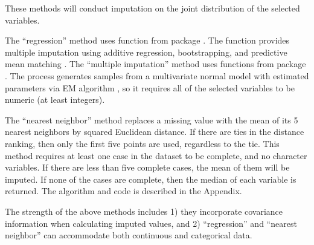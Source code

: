 \documentclass[article]{jss}
\begin{document}
These methods will conduct imputation on the joint distribution of the selected variables. 

The ``regression'' method uses function  from package . The function provides multiple imputation using additive regression, bootstrapping, and predictive mean matching \citep{hmisc}. The ``multiple imputation'' method uses functions from package . The process generates samples from a multivariate normal model with estimated parameters via EM algorithm \citep{norm}, so it requires all of the selected variables to be numeric (at least integers).

The ``nearest neighbor'' method replaces a missing value with the mean of its 5 nearest neighbors by squared Euclidean distance. If there are ties in the distance ranking, then only the first five points are used, regardless to the tie. This method requires at least one case in the dataset to be complete, and no character variables. If there are less than five complete cases, the mean of them will be imputed. If none of the cases are complete, then the median of each variable is returned. The algorithm and code is described in the Appendix.

The strength of the above methods includes 1) they incorporate covariance information when calculating imputed values, and  2) ``regression'' and ``nearest neighbor'' can accommodate both continuous and categorical data.
\end{document}

